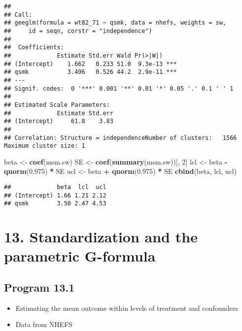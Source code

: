 \documentclass[
  10pt,
]{book}
\newenvironment{Shaded}{\begin{snugshade}}{\end{snugshade}}
\newcommand{\DecValTok}[1]{\textcolor[rgb]{0.00,0.00,0.81}{#1}}
\newcommand{\FloatTok}[1]{\textcolor[rgb]{0.00,0.00,0.81}{#1}}
\newcommand{\KeywordTok}[1]{\textcolor[rgb]{0.13,0.29,0.53}{\textbf{#1}}}
\newcommand{\NormalTok}[1]{#1}
\newcommand{\OperatorTok}[1]{\textcolor[rgb]{0.81,0.36,0.00}{\textbf{#1}}}
\newcommand{\StringTok}[1]{\textcolor[rgb]{0.31,0.60,0.02}{#1}}
\providecommand{\tightlist}{%
  \setlength{\itemsep}{0pt}\setlength{\parskip}{0pt}}
\begin{document}
\begin{verbatim}
## 
## Call:
## geeglm(formula = wt82_71 ~ qsmk, data = nhefs, weights = sw, 
##     id = seqn, corstr = "independence")
## 
##  Coefficients:
##             Estimate Std.err Wald Pr(>|W|)    
## (Intercept)    1.662   0.233 51.0  9.3e-13 ***
## qsmk           3.496   0.526 44.2  2.9e-11 ***
## ---
## Signif. codes:  0 '***' 0.001 '**' 0.01 '*' 0.05 '.' 0.1 ' ' 1
## 
## Estimated Scale Parameters:
##             Estimate Std.err
## (Intercept)     61.8    3.83
## 
## Correlation: Structure = independenceNumber of clusters:   1566   Maximum cluster size: 1
\end{verbatim}

\begin{Shaded}
\begin{Highlighting}[]
\NormalTok{beta <-}\StringTok{ }\KeywordTok{coef}\NormalTok{(msm.sw)}
\NormalTok{SE <-}\StringTok{ }\KeywordTok{coef}\NormalTok{(}\KeywordTok{summary}\NormalTok{(msm.sw))[, }\DecValTok{2}\NormalTok{]}
\NormalTok{lcl <-}\StringTok{ }\NormalTok{beta }\OperatorTok{-}\StringTok{ }\KeywordTok{qnorm}\NormalTok{(}\FloatTok{0.975}\NormalTok{) }\OperatorTok{*}\StringTok{ }\NormalTok{SE}
\NormalTok{ucl <-}\StringTok{ }\NormalTok{beta }\OperatorTok{+}\StringTok{ }\KeywordTok{qnorm}\NormalTok{(}\FloatTok{0.975}\NormalTok{) }\OperatorTok{*}\StringTok{ }\NormalTok{SE}
\KeywordTok{cbind}\NormalTok{(beta, lcl, ucl)}
\end{Highlighting}
\end{Shaded}

\begin{verbatim}
##             beta  lcl  ucl
## (Intercept) 1.66 1.21 2.12
## qsmk        3.50 2.47 4.53
\end{verbatim}

\hypertarget{standardization-and-the-parametric-g-formula}{%
\chapter*{13. Standardization and the parametric G-formula}\label{standardization-and-the-parametric-g-formula}}

\hypertarget{program-13.1}{%
\section{Program 13.1}\label{program-13.1}}

\begin{itemize}
\tightlist
\item
  Estimating the mean outcome within levels of treatment and confounders
\item
  Data from NHEFS
\end{itemize}
\end{document}

